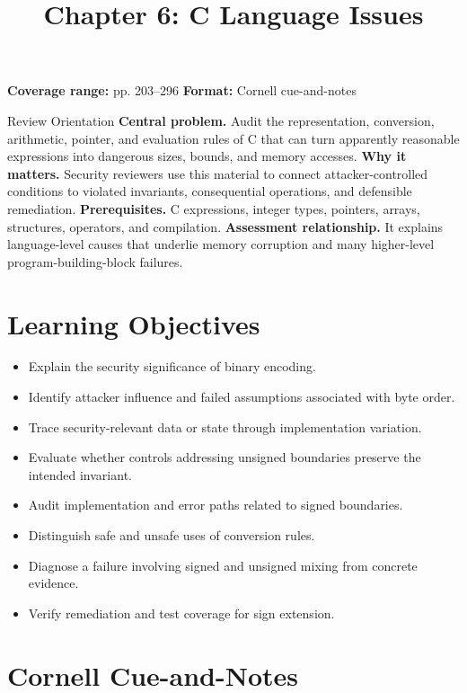 \documentclass[11pt,letterpaper]{article}
\title{Chapter 6: C Language Issues}
\author{}
\date{}
\begin{document}
\maketitle

\begin{center}
\small\color{Meta}\textbf{Coverage range:} pp. 203--296 \quad\textbullet\quad \textbf{Format:} Cornell cue-and-notes
\end{center}
\vspace{0.25em}
\begin{CornellOverviewBox}{Review Orientation}
\textbf{Central problem.} Audit the representation, conversion, arithmetic, pointer, and evaluation rules of C that can turn apparently reasonable expressions into dangerous sizes, bounds, and memory accesses.
\textbf{Why it matters.} Security reviewers use this material to connect attacker-controlled conditions to violated invariants, consequential operations, and defensible remediation.
\textbf{Prerequisites.} C expressions, integer types, pointers, arrays, structures, operators, and compilation.
\textbf{Assessment relationship.} It explains language-level causes that underlie memory corruption and many higher-level program-building-block failures.
\end{CornellOverviewBox}
\section{Learning Objectives}
\begin{itemize}
\item Explain the security significance of binary encoding.
\item Identify attacker influence and failed assumptions associated with byte order.
\item Trace security-relevant data or state through implementation variation.
\item Evaluate whether controls addressing unsigned boundaries preserve the intended invariant.
\item Audit implementation and error paths related to signed boundaries.
\item Distinguish safe and unsafe uses of conversion rules.
\item Diagnose a failure involving signed and unsigned mixing from concrete evidence.
\item Verify remediation and test coverage for sign extension.
\end{itemize}
\section{Cornell Cue-and-Notes}
\end{document}
